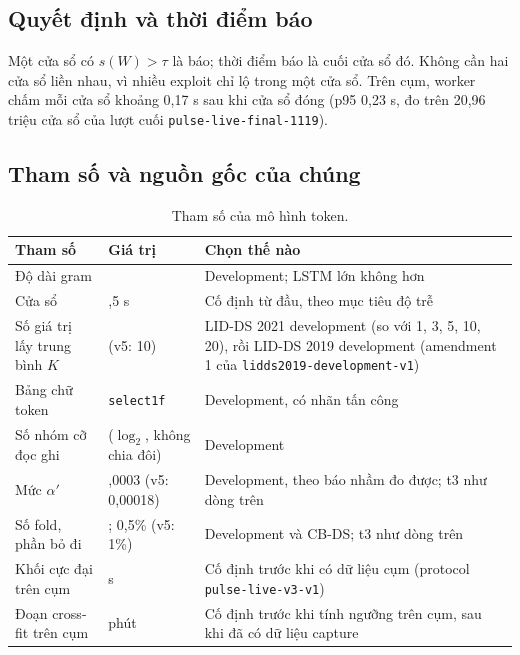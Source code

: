 \subsection{Quyết định và thời điểm báo}

Một cửa sổ có $s(W) > \tau$ là báo; thời điểm báo là cuối cửa sổ đó. Không cần hai cửa sổ liền nhau, vì nhiều exploit chỉ lộ trong một cửa sổ. Trên cụm, worker chấm mỗi cửa sổ khoảng 0,17 s sau khi cửa sổ đóng (p95 0,23 s, đo trên 20,96 triệu cửa sổ của lượt cuối \texttt{pulse-\allowbreak{}live-\allowbreak{}final-\allowbreak{}1119}).

\subsection{Tham số và nguồn gốc của chúng}

\begin{longtable}[]{@{}>{\raggedright\arraybackslash}p{}>{\raggedright\arraybackslash}p{}>{\raggedright\arraybackslash}p{}@{}}
\caption{Tham số của mô hình token.}\label{tab:token-params}\\
\toprule\noalign{}
Tham số & Giá trị & Chọn thế nào \\
\midrule\noalign{}
\endhead
\bottomrule\noalign{}
\endlastfoot
Độ dài gram & 4 & Development; LSTM lớn không hơn \\
Cửa sổ & 0,5 s & Cố định từ đầu, theo mục tiêu độ trễ \\
Số giá trị lấy trung bình $K$ & 3 (v5: 10) & LID-DS 2021 development (so với 1, 3, 5, 10, 20), rồi LID-DS 2019 development (amendment 1 của \texttt{lidds2019-\allowbreak{}development-\allowbreak{}v1}) \\
Bảng chữ token & \texttt{select1f} & Development, có nhãn tấn công \\
Số nhóm cỡ đọc ghi & 16 ($\log_2$, không chia đôi) & Development \\
Mức $\alpha'$ & 0,0003 (v5: 0,00018) & Development, theo báo nhầm đo được; t3 như dòng trên \\
Số fold, phần bỏ đi & 5; 0,5\% (v5: 1\%) & Development và CB-DS; t3 như dòng trên \\
Khối cực đại trên cụm & 60 s & Cố định trước khi có dữ liệu cụm (protocol \texttt{pulse-\allowbreak{}live-\allowbreak{}v3-\allowbreak{}v1}) \\
Đoạn cross-fit trên cụm & 30 phút & Cố định trước khi tính ngưỡng trên cụm, sau khi đã có dữ liệu capture \\
\end{longtable}

